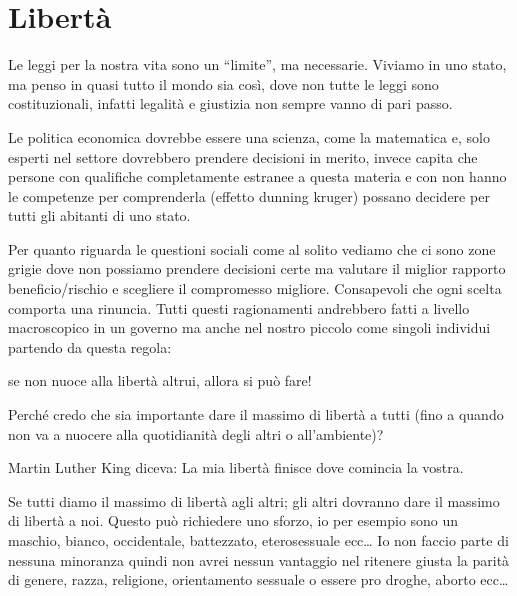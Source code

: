 \documentclass[12pt]{book} %
\begin{document}
\clearpage\section{Libertà}
Le leggi per la nostra vita sono un “limite”, ma necessarie. Viviamo in uno stato, ma penso in quasi tutto il mondo sia
così, dove non tutte le leggi sono costituzionali, infatti legalità e giustizia non sempre vanno di pari passo.

Le politica economica dovrebbe essere una scienza, come la matematica e, solo esperti nel settore dovrebbero prendere
decisioni in merito, invece capita che persone con qualifiche completamente estranee a questa materia e con non hanno
le competenze per comprenderla (effetto dunning kruger) possano decidere per tutti gli abitanti di uno stato.

Per quanto riguarda le questioni sociali come al solito vediamo che ci sono zone grigie dove non possiamo prendere
decisioni certe ma valutare il miglior rapporto beneficio/rischio e scegliere il compromesso migliore. Consapevoli che
ogni scelta comporta una rinuncia. Tutti questi ragionamenti andrebbero fatti a livello macroscopico in un governo ma
anche nel nostro piccolo come singoli individui partendo da questa regola: 

se non nuoce alla libertà altrui, allora si può fare!


\bigskip

Perché credo che sia importante dare il massimo di libertà a tutti (fino a quando non va a nuocere alla quotidianità
degli altri o all'ambiente)?

Martin Luther King diceva: La mia libertà finisce dove comincia la vostra.

Se tutti diamo il massimo di libertà agli altri; gli altri dovranno dare il massimo di libertà a noi. Questo può
richiedere uno sforzo, io per esempio sono un maschio, bianco, occidentale, battezzato, eterosessuale ecc… Io non
faccio parte di nessuna minoranza quindi non avrei nessun vantaggio nel ritenere giusta la parità di genere, razza,
religione, orientamento sessuale o essere pro droghe, aborto ecc… 
\end{document}
